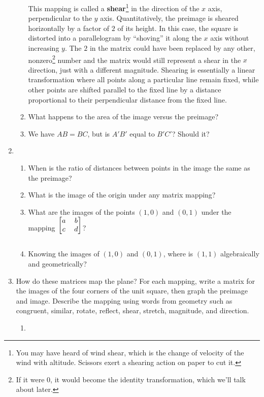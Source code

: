 \documentclass[../gatm.tex]{subfiles}
\begin{document}
\begin{enumerate}
\begin{enumerate}
This mapping is called a \textbf{shear}\footnote{You may have heard of wind shear, which is the change of velocity of the wind with altitude. Scissors exert a shearing action on paper to cut it.} in the direction of the $x$ axis, perpendicular to the $y$ axis. Quantitatively, the preimage is sheared horizontally by a factor of $2$ of its height.  In this case, the square is distorted into a parallelogram by ``shoving'' it along the $x$ axis without increasing $y$. The $2$ in the matrix could have been replaced by any other, nonzero\footnote{If it were $0$, it would become the identity transformation, which we'll talk about later.} number and the matrix would still represent a shear in the $x$ direction, just with a different magnitude. Shearing is essentially a linear transformation where all points along a particular line remain fixed, while other points are shifted parallel to the fixed line by a distance proportional to their perpendicular distance from the fixed line.
\item What happens to the area of the image versus the preimage?
\item We have $AB=BC$, but is $A'B'$ equal to $B'C'$? Should it?
\end{enumerate}
\item \begin{enumerate}
\item When is the ratio of distances between points in the image the same as the preimage?
\item What is the image of the origin under any matrix mapping?
\item What are the images of the points $(1,0)$ and $(0,1)$ under the mapping $\begin{blockarray}{[cc]} a & b \\ c & d \end{blockarray}$?
\item Knowing the images of $(1,0)$ and $(0,1)$, where is $(1,1)$ algebraically and geometrically?
\end{enumerate}
\item How do these matrices map the plane? For each mapping, write a matrix for the images of the four corners of the unit square, then graph the preimage and image. Describe the mapping using words from geometry such as congruent, similar, rotate, reflect, shear, stretch, magnitude, and direction. \label{prob:map_plane_sixteen_matrices}
\begin{multicols}{4}
\begin{enumerate}
\item {}

\end{enumerate}
\end{multicols}
\end{enumerate}
\end{document}
